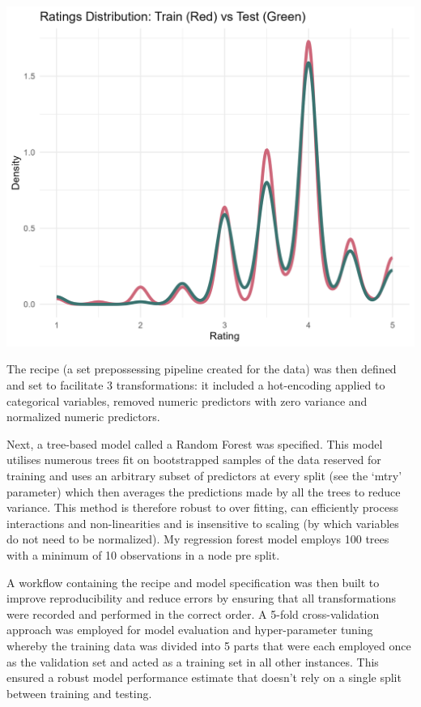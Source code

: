 \documentclass[11pt,preprint]{elsarticle}
\let\origfigure\figure
\let\endorigfigure\endfigure
\renewenvironment{figure}[1][2] {
    \expandafter\origfigure\expandafter[H]
} {
    \endorigfigure
}
\numberwithin{equation}{section}
\numberwithin{figure}{section}
\numberwithin{table}{section}
\begin{document}
\begin{figure}[H]
\includegraphics[width=0.8\linewidth]{writeup/fig3} \caption{Distribution of training and testing data}\label{fig:fig3}
\end{figure}

The recipe (a set prepossessing pipeline created for the data) was then
defined and set to facilitate 3 transformations: it included a
hot-encoding applied to categorical variables, removed numeric
predictors with zero variance and normalized numeric predictors.

Next, a tree-based model called a Random Forest was specified. This
model utilises numerous trees fit on bootstrapped samples of the data
reserved for training and uses an arbitrary subset of predictors at
every split (see the `mtry' parameter) which then averages the
predictions made by all the trees to reduce variance. This method is
therefore robust to over fitting, can efficiently process interactions
and non-linearities and is insensitive to scaling (by which variables do
not need to be normalized). My regression forest model employs 100 trees
with a minimum of 10 observations in a node pre split.

A workflow containing the recipe and model specification was then built
to improve reproducibility and reduce errors by ensuring that all
transformations were recorded and performed in the correct order. A
5-fold cross-validation approach was employed for model evaluation and
hyper-parameter tuning whereby the training data was divided into 5
parts that were each employed once as the validation set and acted as a
training set in all other instances. This ensured a robust model
performance estimate that doesn't rely on a single split between
training and testing.
\end{document}
